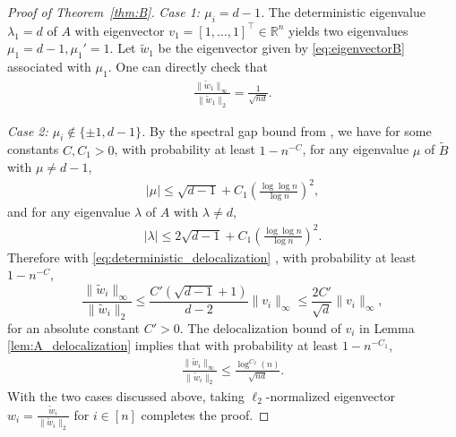 \documentclass[11pt,reqno]{amsart}
\theoremstyle{definition}
\begin{document}
\begin{proof}[Proof of Theorem~\ref{thm:B}]

 \textit{Case 1: $\mu_i=d-1$.} The deterministic eigenvalue $\lambda_1=d$ of $A$ with eigenvector $v_1=[1,\dots, 1]^\top \in \mathbb R^n$ yields two eigenvalues $\mu_1=d-1, \mu_1'=1$. Let  $\tilde w_1$ be the eigenvector given by \eqref{eq:eigenvectorB} associated with $\mu_1$. One can directly check that 
      \begin{align}
          \frac{ \|\tilde w_1\|_{\infty}}{\|\tilde w_1\|_2}= \frac{1}{\sqrt{nd}}.
      \end{align}

\textit{Case 2: $\mu_i\notin\{\pm 1,d-1\}$.} By the spectral gap bound from \cite[Theorem 1]{bordenave2020new},  we have for some constants $C,C_1>0$, with probability at least $1-n^{-C}$, for any eigenvalue $\mu$ of $\tilde B$ with $\mu\not=d-1$,
\begin{align}\label{eq:spectralgap}
    |\mu|\leq \sqrt{d-1}+C_1\left( \frac{\log \log n}{\log n}\right)^2,
\end{align} 
and for any eigenvalue $\lambda$ of $A$ with $\lambda \neq d$, \begin{align}\label{eq:spectralgap_lambda}
    |\lambda| \leq 2\sqrt{d-1}+C_1\left( \frac{\log \log n}{\log n}\right)^2.
\end{align}
Therefore with \eqref{eq:deterministic_delocalization} , with probability at least $1-n^{-C}$, \begin{equation}
     \frac{\|\tilde w_i\|_{\infty}}{\|\tilde w_i\|_2} \leq \frac{C'(\sqrt{d-1}+1) }{ d-2 } \|v_i\|_{\infty} \leq \frac{2C'}{ \sqrt{d}}   \|v_i\|_{\infty},
\end{equation}
      for an absolute constant $C'>0$. 
 The delocalization bound of $v_i$ in Lemma \ref{lem:A_delocalization} implies that with probability at least $1-n^{-C_1}$, 
       \begin{align} \label{eq:ratiobound}
       \frac{\|\tilde w_i\|_{\infty}}{\|\tilde w_i\|_2} \leq {\frac{\log^{C_2}(n)}{\sqrt{nd}}}.
       \end{align}
       With the two cases discussed above, taking $\ell_2$-normalized eigenvector $w_i=\frac{\tilde w_i}{\|\tilde w_i\|_2}$ for $i\in [n]$ completes the proof. 
\end{proof}
\end{document}
